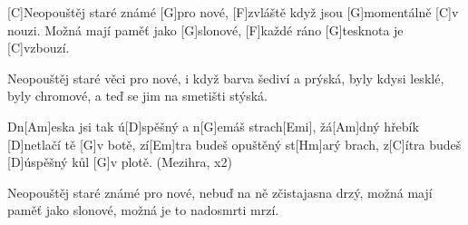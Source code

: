 
[C]Neopouštěj staré známé [G]pro nové,
[F]zvláště když jsou [G]momentálně [C]v nouzi.
Možná mají paměť jako [G]slonové,
[F]každé ráno [G]tesknota je [C]vzbouzí.

Neopouštěj staré věci pro nové,
i když barva šediví a prýská,
byly kdysi lesklé, byly chromové,
a teď se jim na smetišti stýská.

Dn[Am]eska jsi tak ú[D]spěšný a n[G]emáš strach[Emi],
žá[Am]dný hřebík [D]netlačí tě [G]v botě,
zí[Em]tra budeš opuštěný st[Hm]arý brach,
z[C]\null ítra budeš [D]\null úspěšný kůl [G]v plotě. (Mezihra, x2)

Neopouštěj staré známé pro nové,
nebuď na ně zčistajasna drzý,
možná mají paměť jako slonové,
možná je to nadosmrti mrzí.





